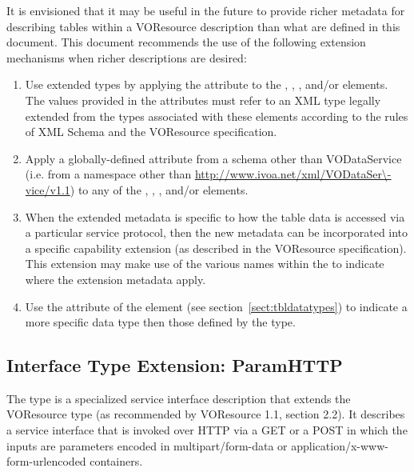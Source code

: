 \documentclass[11pt,a4paper]{ivoa}
\begin{document}
It is envisioned that it may be useful in the future to provide richer
metadata for describing tables within a VOResource description than
what are defined in this document.  This document recommends the
use of the following extension mechanisms when richer descriptions are
desired:

\begin{enumerate}
\item Use extended types by applying the 
       attribute to the ,
       , ,
        and/or
        elements.  The values provided in the
       attributes must refer to an XML type legally extended from the types
       associated with these elements according to the rules of XML Schema
       \citep{std:XSD} and the VOResource specification.

\item Apply a globally-defined attribute from a schema other than
       VODataService (i.e. from a namespace other than
       \url{http://www.ivoa.net/xml/VODataSer\-vice/v1.1}) to any of the
       , ,
       , and/or 
       elements.

\item When the extended metadata is specific to how the table data is
       accessed via a particular service protocol, then the new
       metadata can be incorporated into a specific capability
       extension (as described in the VOResource specification).
       This extension may make use of the
       various names within the  to
       indicate where the extension metadata apply.

\item Use the  attribute of the
        element (see
       section~\ref{sect:tbldatatypes})
       to indicate a more specific data type then those defined by the
        type.
\end{enumerate}

\subsection{Interface Type Extension: ParamHTTP}
\label{sect:paramif}


The  type is a specialized service interface
description that extends the VOResource  type
(as recommended by VOResource 1.1, section 2.2).  It
describes a service interface that is invoked over HTTP via a GET or a
POST in which the inputs are parameters
encoded in multipart/form-data or application/x-www-form-urlencoded
containers.
\end{document}
